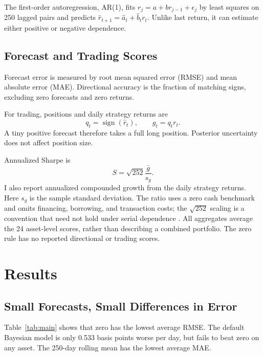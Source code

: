 \documentclass[conference]{IEEEtran}
\newcommand{\sgn}{\operatorname{sign}}
\begin{document}
The first-order autoregression, AR(1), fits $r_j=a+br_{j-1}+\epsilon_j$ by least squares on 250 lagged pairs and predicts $\hat r_{t+1}=\hat a_t+\hat b_t r_t$. Unlike last return, it can estimate either positive or negative dependence.

\subsection{Forecast and Trading Scores}
Forecast error is measured by root mean squared error (RMSE) and mean absolute error (MAE). Directional accuracy is the fraction of matching signs, excluding zero forecasts and zero returns.

For trading, positions and daily strategy returns are
\begin{equation}
 q_t=\sgn(\hat r_t),\qquad g_t=q_t r_t.
 \label{eq:trading}
\end{equation}
A tiny positive forecast therefore takes a full long position. Posterior uncertainty does not affect position size.

Annualized Sharpe is
\begin{equation}
 S=\sqrt{252}\frac{\bar g}{s_g}.
 \label{eq:sharpe}
\end{equation}
I also report annualized compounded growth from the daily strategy returns.
Here $s_g$ is the sample standard deviation. The ratio uses a zero cash benchmark and omits financing, borrowing, and transaction costs; the $\sqrt{252}$ scaling is a convention that need not hold under serial dependence \cite{sharpe}. All aggregates average the 24 asset-level scores, rather than describing a combined portfolio. The zero rule has no reported directional or trading scores.

\section{Results}
\subsection{Small Forecasts, Small Differences in Error}
Table~\ref{tab:main} shows that zero has the lowest average RMSE. The default Bayesian model is only 0.533 basis points worse per day, but fails to beat zero on any asset. The 250-day rolling mean has the lowest average MAE.
\end{document}
